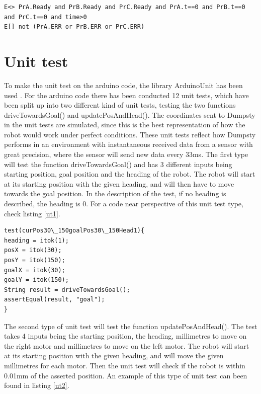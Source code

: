 \begin{lstlisting}[caption={Queries for UPPAAL}, label={Queries}]
E<> PrA.Ready and PrB.Ready and PrC.Ready and PrA.t==0 and PrB.t==0 and PrC.t==0 and time>0
E[] not (PrA.ERR or PrB.ERR or PrC.ERR)
\end{lstlisting}


\section{Unit test}
\label{sec:Unit test}
To make the unit test on the arduino code, the library ArduinoUnit has been used \citep{au}. For the arduino code there has been conducted 12 unit tests, which have been split up into two different kind of unit tests, testing the two functions driveTowardsGoal() and updatePosAndHead(). \newline
The coordinates sent to Dumpsty in the unit tests are simulated, since this is the best representation of how the robot would work under perfect conditions. These unit tests reflect how Dumpsty performs in an environment with instantaneous received data from a sensor with great precision, where the sensor will send new data every 33ms. 
The first type will test the function driveTowardsGoal() and has 3 different inputs being starting position, goal position and the heading of the robot. The robot will start at its starting position with the given heading, and will then have to move towards the goal position. In the description of the test, if no heading is described, the heading is 0. For a code near perspective of this unit test type, check listing \ref{ut1}.


\begin{lstlisting}[caption={First type of Unit test}, label={ut1}]
test(curPos30\_150goalPos30\_150Head1){
heading = itok(1);
posX = itok(30);
posY = itok(150);
goalX = itok(30);
goalY = itok(150);
String result = driveTowardsGoal();
assertEqual(result, "goal");
}
\end{lstlisting}


The second type of unit test will test the function updatePosAndHead(). The test takes 4 inputs being the starting position, the heading, millimetres to move on the right motor and millimetres to move on the left motor. The robot will start at its starting position with the given heading, and will move the given millimetres for each motor. Then the unit test will check if the robot is within 0.01mm of the asserted position. An example of this type of unit test can been found in listing \ref{ut2}.


